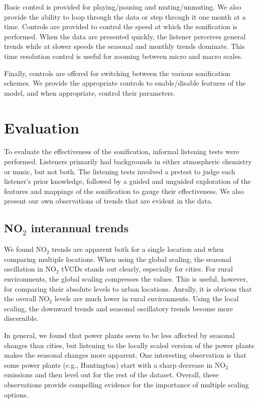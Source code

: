 \documentclass[a4paper,10pt,oneside]{article}
\newcommand{\ce}[1]{$\mathrm{#1}$}
\begin{document}
\begin{sloppy}
Basic control is provided for playing/pausing and muting/unmuting. We also provide the ability to loop through the data or step through it one month at a time.  Controls are provided to control the speed at which the sonification is performed.  When the data are presented quickly, the listener perceives general trends while at slower speeds the seasonal and monthly trends dominate.  This time resolution control is useful for zooming between micro and macro scales.  

Finally, controls are offered for switching between the various sonification schemes. We provide the appropriate controls to enable/disable features of the model, and when appropriate, control their parameters.  

\section{Evaluation}

To evaluate the effectiveness of the sonification, informal listening tests were performed. Listeners primarily had backgrounds in either atmospheric chemistry or music, but not both. The listening tests involved a pretest to judge each listener's prior knowledge, followed by a guided and unguided exploration of the features and mappings of the sonification to gauge their effectiveness.  We also present our own observations of trends that are evident in the data.

\subsection{NO$_2$ interannual trends}\label{sec:nox-trends-listening}
We found \ce{NO_2} trends are apparent both for a single location and when comparing multiple locations.  When using the global scaling, the seasonal oscillation in \ce{NO_2} tVCDs stands out clearly, especially for cities. For rural environments, the global scaling compresses the values.  This is useful, however, for comparing their absolute levels to urban locations.  Aurally, it is obvious that the overall \ce{NO_2} levels are much lower in rural environments. Using the local scaling, the downward trends and seasonal oscillatory trends become more discernible. 

In general, we found that power plants seem to be less affected by seasonal changes than cities, but listening to the locally scaled version of the power plants makes the seasonal changes more apparent. One interesting observation is that some power plants (e.g., Huntington) start with a sharp decrease in \ce{NO_2} emissions and then level out for the rest of the dataset. Overall, these observations provide compelling evidence for the importance of multiple scaling options.  


\end{sloppy}
\end{document}
